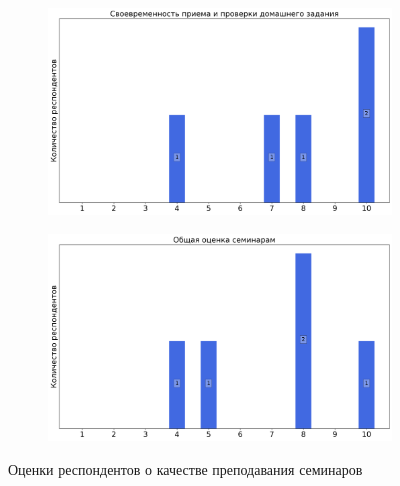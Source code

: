 \begin{figure}[H]
\begin{subfigure}[b]{0.45\textwidth}
				\includegraphics[width=\textwidth]{images/2 course/Общая физика - электричество и магнетизм/seminarists-marks-Седельников Е.В.-2.png}
			\end{subfigure}
			\begin{subfigure}[b]{0.45\textwidth}
				\centering
				\includegraphics[width=\textwidth]{images/2 course/Общая физика - электричество и магнетизм/seminarists-marks-Седельников Е.В.-3.png}
			\end{subfigure}	
			\caption{Оценки респондентов о качестве преподавания семинаров}
		\end{figure}


